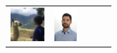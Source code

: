 \documentclass[usenames,dvipsnames,aspectratio=169,12pt]{beamer}
\begin{document}
\begin{frame}
\begin{figure}
\begin{tabular}{ccccc}
    {\includegraphics[height = 0.5in]{me.jpg}}         &
    {\includegraphics[height = 0.5in]{andreas.jpg}}
    \end{tabular}
  \end{figure}
\end{frame}
\end{document}

